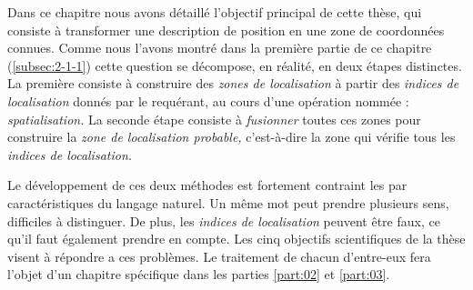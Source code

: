 Dans ce chapitre nous avons détaillé l'objectif principal de cette
thèse, qui consiste à transformer une description de position en une
zone de coordonnées connues. Comme nous l'avons montré dans la
première partie de ce chapitre (\ref{subsec:2-1-1}) cette question se
décompose, en réalité, en deux étapes distinctes. La première consiste
à construire des \emph{zones de localisation} à partir des
\emph{indices de localisation} donnés par le requérant, au cours d'une
opération nommée : \emph{spatialisation.} La seconde étape consiste à
\emph{fusionner} toutes ces zones pour construire la \emph{zone de
  localisation probable,} c'est-à-dire la zone qui vérifie tous les
\emph{indices de localisation.}

Le développement de ces deux méthodes est fortement contraint les par
caractéristiques du langage naturel. Un même mot peut prendre
plusieurs sens, difficiles à distinguer. De plus, les \emph{indices de
  localisation} peuvent être faux, ce qu'il faut également prendre en
compte. Les cinq objectifs scientifiques de la thèse visent à répondre
a ces problèmes. Le traitement de chacun d'entre-eux fera l'objet d'un
chapitre spécifique dans les parties \ref{part:02} et \ref{part:03}.

